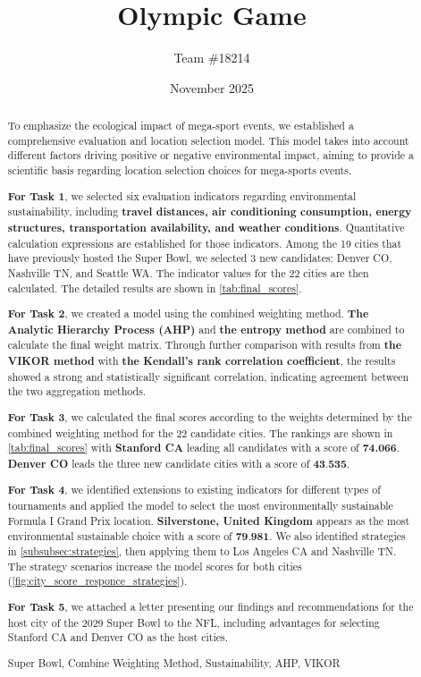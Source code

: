\documentclass{mcmthesis}
\title{Olympic Game}
\author{\small Team \#18214}
\date{November 2025}
\begin{document}
\begin{abstract}  

To emphasize the ecological impact of mega-sport events, we established a comprehensive evaluation and location selection model. This model takes into account different factors driving positive or negative environmental impact, aiming to provide a scientific basis regarding location selection choices for mega-sports events. 

\textbf{For Task 1}, we selected six evaluation indicators regarding environmental sustainability, including\textbf{ travel distances, air conditioning consumption, energy structures, transportation availability, and weather conditions}. Quantitative calculation expressions are established for those indicators. Among the 19 cities that have previously hosted the Super Bowl, we selected 3 new candidates: Denver CO, Nashville TN, and Seattle WA. The indicator values for the 22 cities are then calculated. The detailed results are shown in \cref{tab:final_scores}. 

\textbf{For Task 2}, we created a model using the combined weighting method. \textbf{The Analytic Hierarchy Process (AHP)} and\textbf{ the entropy method} are combined to calculate the final weight matrix. Through further comparison with results from \textbf{the VIKOR method} with \textbf{the Kendall's rank correlation coefficient}, the results showed a strong and statistically significant correlation, indicating agreement between the two aggregation methods.

\textbf{For Task 3}, we calculated the final scores according to the weights determined by the combined weighting method for the 22 candidate cities. The rankings are shown in \cref{tab:final_scores} with \textbf{Stanford CA} leading all candidates with a score of \textbf{74.066}. \textbf{Denver CO} leads the three new candidate cities with a score of $\textbf{43.535}$.

\textbf{For Task 4}, we identified extensions to existing indicators for different types of tournaments and applied the model to select the most environmentally sustainable Formula I Grand Prix location. \textbf{Silverstone, United Kingdom} appears as the most environmental sustainable choice with a score of $\textbf{79.981}$. We also identified strategies in \cref{subsubsec:strategies}, then applying them to Los Angeles CA and Nashville TN. The strategy scenarios increase the model scores for both cities (\cref{fig:city_score_responce_strategies}).

\textbf{For Task 5}, we attached a letter presenting our findings and recommendations for the host city of the 2029 Super Bowl to the NFL, including advantages for selecting Stanford CA and Denver CO as the host cities. 

\begin{keywords}  
Super Bowl, Combine Weighting Method, Sustainability, AHP, VIKOR
\end{keywords} 
\end{abstract}
\maketitle
\end{document}
